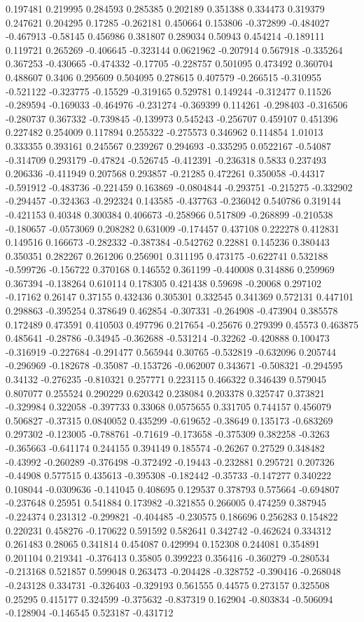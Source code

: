 0.197481 0.219995 0.284593 0.285385 0.202189 0.351388 0.334473 0.319379 0.247621 0.204295 0.17285 -0.262181 0.450664 0.153806 -0.372899 -0.484027 -0.467913 -0.58145 0.456986 0.381807 0.289034 0.50943 0.454214 -0.189111 0.119721 0.265269 -0.406645 -0.323144 0.0621962 -0.207914 0.567918 -0.335264 0.367253 -0.430665 -0.474332 -0.17705 -0.228757 0.501095 0.473492 0.360704 0.488607 0.3406 0.295609 0.504095 0.278615 0.407579 -0.266515 -0.310955 -0.521122 -0.323775 -0.15529 -0.319165 0.529781 0.149244 -0.312477 0.11526 -0.289594 -0.169033 -0.464976 -0.231274 -0.369399 0.114261 -0.298403 -0.316506 -0.280737 0.367332 -0.739845 -0.139973 0.545243 -0.256707 0.459107 0.451396 0.227482 0.254009 0.117894 0.255322 -0.275573 0.346962 0.114854 1.01013 0.333355 0.393161 0.245567 0.239267 0.294693 -0.335295 0.0522167 -0.54087 -0.314709 0.293179 -0.47824 -0.526745 -0.412391 -0.236318 0.5833 0.237493 0.206336 -0.411949 0.207568 0.293857 -0.21285 0.472261 0.350058 -0.44317 -0.591912 -0.483736 -0.221459 0.163869 -0.0804844 -0.293751 -0.215275 -0.332902 -0.294457 -0.324363 -0.292324 0.143585 -0.437763 -0.236042 0.540786 0.319144 -0.421153 0.40348 0.300384 0.406673 -0.258966 0.517809 -0.268899 -0.210538 -0.180657 -0.0573069 0.208282 0.631009 -0.174457 0.437108 0.222278 0.412831 0.149516 0.166673 -0.282332 -0.387384 -0.542762 0.22881 0.145236 0.380443 0.350351 0.282267 0.261206 0.256901 0.311195 0.473175 -0.622741 0.532188 -0.599726 -0.156722 0.370168 0.146552 0.361199 -0.440008 0.314886 0.259969 0.367394 -0.138264 0.610114 0.178305 0.421438 0.59698 -0.20068 0.297102 -0.17162 0.26147 0.37155 0.432436 0.305301 0.332545 0.341369 0.572131 0.447101 0.298863 -0.395254 0.378649 0.462854 -0.307331 -0.264908 -0.473904 0.385578 0.172489 0.473591 0.410503 0.497796 0.217654 -0.25676 0.279399 0.45573 0.463875 0.485641 -0.28786 -0.34945 -0.362688 -0.531214 -0.32262 -0.420888 0.100473 -0.316919 -0.227684 -0.291477 0.565944 0.30765 -0.532819 -0.632096 0.205744 -0.296969 -0.182678 -0.35087 -0.153726 -0.062007 0.343671 -0.508321 -0.294595 0.34132 -0.276235 -0.810321 0.257771 0.223115 0.466322 0.346439 0.579045 0.807077 0.255524 0.290229 0.620342 0.238084 0.203378 0.325747 0.373821 -0.329984 0.322058 -0.397733 0.33068 0.0575655 0.331705 0.744157 0.456079 0.506827 -0.37315 0.0840052 0.435299 -0.619652 -0.38649 0.135173 -0.683269 0.297302 -0.123005 -0.788761 -0.71619 -0.173658 -0.375309 0.382258 -0.3263 -0.365663 -0.641174 0.244155 0.394149 0.185574 -0.26267 0.27529 0.348482 -0.43992 -0.260289 -0.376498 -0.372492 -0.19443 -0.232881 0.295721 0.207326 -0.44908 0.577515 0.435613 -0.395308 -0.182442 -0.35733 -0.147277 0.340222 0.108044 -0.0309636 -0.141045 0.408695 0.129537 0.378793 0.575664 -0.694807 -0.237648 0.25951 0.541884 0.173982 -0.321855 0.266005 0.474259 0.387945 -0.224374 0.231312 -0.299821 -0.404485 -0.230575 0.186696 0.256283 0.154822 0.220231 0.458276 -0.170622 0.591592 0.582641 0.342742 -0.462624 0.334312 0.261483 0.28065 0.341814 0.454087 0.429994 0.152308 0.244081 0.354891 0.201104 0.219341 -0.376413 0.35805 0.399223 0.356416 -0.360279 -0.280534 -0.213168 0.521857 0.599048 0.263473 -0.204428 -0.328752 -0.390416 -0.268048 -0.243128 0.334731 -0.326403 -0.329193 0.561555 0.44575 0.273157 0.325508 0.25295 0.415177 0.324599 -0.375632 -0.837319 0.162904 -0.803834 -0.506094 -0.128904 -0.146545 0.523187 -0.431712 